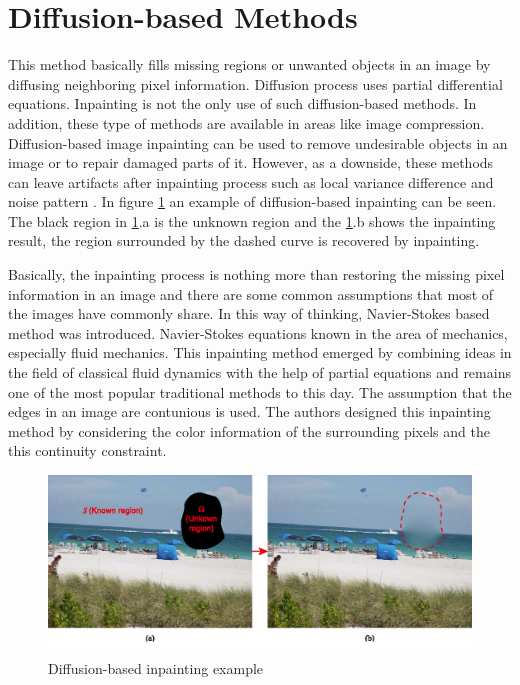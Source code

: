 \section{Diffusion-based Methods}

This method basically fills missing regions or unwanted objects in an image by diffusing neighboring pixel information. Diffusion process uses partial differential equations. Inpainting is not the only use of such diffusion-based methods. In addition, these type of methods are available in areas like image compression. Diffusion-based image inpainting can be used to remove undesirable objects in an image or to repair damaged parts of it. However, as a downside, these methods can leave artifacts after inpainting process such as local variance difference and noise pattern \cite{diffusion_based_artifacts}. In figure \ref{fig:diffusion_based_inpainting} an example of diffusion-based inpainting can be seen. The black region in \ref{fig:diffusion_based_inpainting}.a is the unknown region and the \ref{fig:diffusion_based_inpainting}.b shows the inpainting result, the region surrounded by the dashed curve is recovered by inpainting.

Basically, the inpainting process is nothing more than restoring the missing pixel information in an image and there are some common assumptions that most of the images have commonly share. In this way of thinking, Navier-Stokes based method \cite{navier_stokes} was introduced. Navier-Stokes equations known in the area of mechanics, especially fluid mechanics. This inpainting method emerged by combining ideas in the field of classical fluid dynamics with the help of partial equations and remains one of the most popular traditional methods to this day. The assumption that the edges in an image are contunious is used. The authors designed this inpainting method by considering the color information of the surrounding pixels and the this continuity constraint.

\begin{figure}[h]
    \centering
    \includegraphics[width=14cm]{figures/chapter2/diffusion_based_inpainting.png}
    \caption{Diffusion-based inpainting example \cite{diffusion_based_inpainting}}
    \label{fig:diffusion_based_inpainting}
\end{figure}

